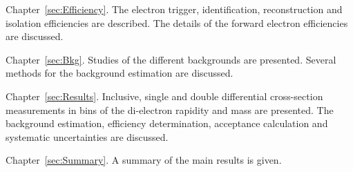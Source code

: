 \begin{description}
\item Chapter~\ref{sec:Efficiency}. The electron trigger, identification, reconstruction and isolation efficiencies are described. The details of the forward electron efficiencies are discussed.

\item Chapter~\ref{sec:Bkg}. Studies of the different backgrounds are presented. Several methods for the background estimation are discussed.

\item Chapter~\ref{sec:Results}. Inclusive, single and double differential cross-section measurements in bins of the di-electron rapidity and mass are presented. The background estimation, efficiency determination, acceptance calculation and systematic uncertainties are discussed.

\item Chapter~\ref{sec:Summary}. A summary of the main results is given.
\end{description}
